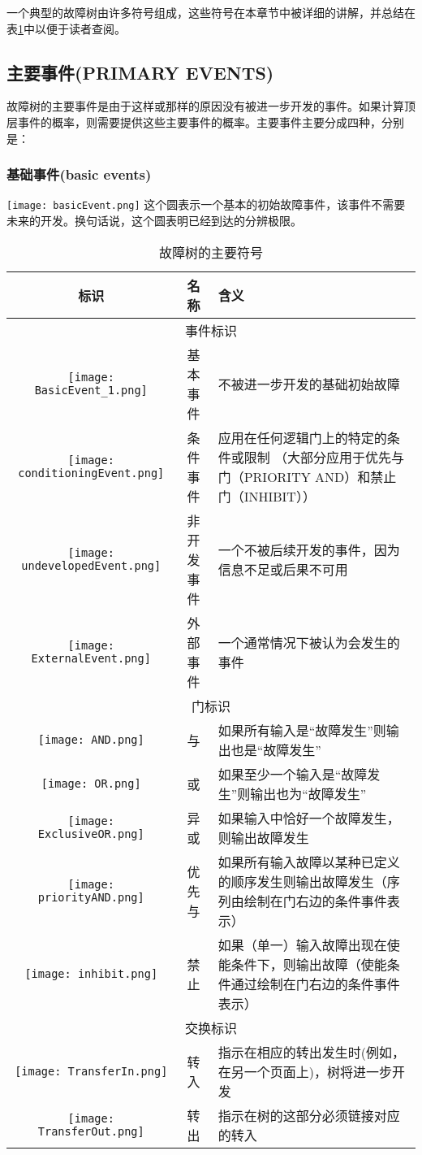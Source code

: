 \documentclass[cn,11pt,chinese]{elegantbook}
\begin{document}
一个典型的故障树由许多符号组成，这些符号在本章节中被详细的讲解，并总结在表\ref{tab:tab4_1}中以便于读者查阅。

\subsection{主要事件(PRIMARY EVENTS)}

故障树的主要事件是由于这样或那样的原因没有被进一步开发的事件。如果计算顶层事件的概率，则需要提供这些主要事件的概率。主要事件主要分成四种，分别是：

\subsubsection{基础事件(basic events)}


\texttt{[image: basicEvent.png]} 这个圆表示一个基本的初始故障事件，该事件不需要未来的开发。换句话说，这个圆表明已经到达的分辨极限。


\begin{table}[h]
	\centering
	\caption{故障树的主要符号}\label{tab:tab4_1}
	\begin{tabular}{|c | c | p{8 cm}|}
		\toprule
		标识 & 名称 & 含义 \\	\midrule
		\multicolumn{3}{|c|}{事件标识} \\ \hline
 		\texttt{[image: BasicEvent\_1.png]}&  基本事件 	& 不被进一步开发的基础初始故障 \\
 		\hline
 \texttt{[image: conditioningEvent.png]}& 条件事件 & 应用在任何逻辑门上的特定的条件或限制	（大部分应用于优先与门（PRIORITY AND）和禁止门（INHIBIT））
\\
\hline
 \texttt{[image: undevelopedEvent.png]}& 非开发事件 & 一个不被后续开发的事件，因为信息不足或后果不可用 \\
 \hline
 \texttt{[image: ExternalEvent.png]} & 外部事件 & 一个通常情况下被认为会发生的事件 \\
 \hline
\multicolumn{3}{|c|}{门标识} \\ \hline
	\texttt{[image: AND.png]} & 与 & 如果所有输入是“故障发生”则输出也是“故障发生” \\ \hline
	\texttt{[image: OR.png]} & 或 & 如果至少一个输入是“故障发生”则输出也为“故障发生” \\ \hline
	\texttt{[image: ExclusiveOR.png]} & 异或 & 如果输入中恰好一个故障发生，则输出故障发生 \\ \hline
	\texttt{[image: priorityAND.png]} & 优先与 & 如果所有输入故障以某种已定义的顺序发生则输出故障发生（序列由绘制在门右边的条件事件表示）\\ \hline
	\texttt{[image: inhibit.png]} & 禁止 & 如果（单一）输入故障出现在使能条件下，则输出故障（使能条件通过绘制在门右边的条件事件表示）\\ \hline
	\multicolumn{3}{|c|}{交换标识} \\ \hline
	\texttt{[image: TransferIn.png]} & 转入 & 指示在相应的转出发生时(例如，在另一个页面上)，树将进一步开发 \\  \hline
	\texttt{[image: TransferOut.png]} & 转出 & 指示在树的这部分必须链接对应的转入 \\	\hline
\end{tabular}
\end{table}
\end{document}
